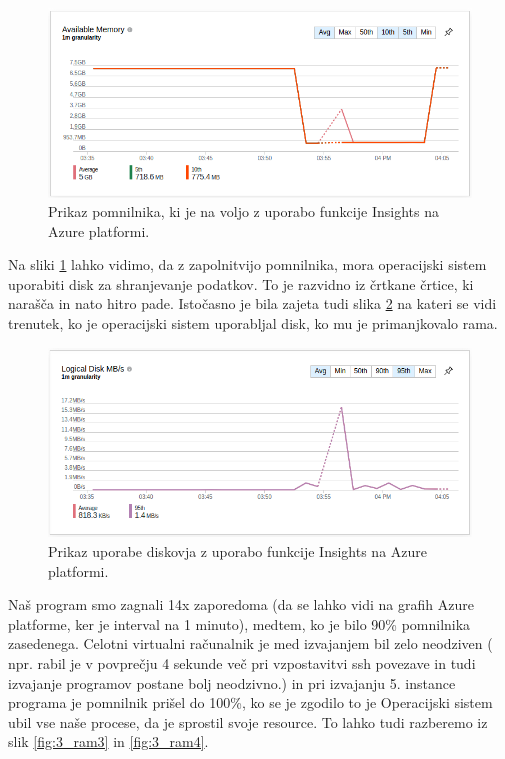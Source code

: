 \begin{figure}[H]
	\centering
	\includegraphics[scale=0.46]{Img/3_ram_obr1.png}
	\caption{Prikaz pomnilnika, ki je na voljo z uporabo funkcije Insights na Azure platformi.}
	\label{fig:3_ram1}
\end{figure}

Na sliki \ref{fig:3_ram1} lahko vidimo, da z zapolnitvijo pomnilnika, mora operacijski sistem uporabiti disk za shranjevanje podatkov. To je razvidno iz črtkane črtice, ki narašča in nato hitro pade. Istočasno je bila zajeta tudi slika \ref{fig:3_ram2} na kateri se vidi trenutek, ko je operacijski sistem uporabljal disk, ko mu je primanjkovalo rama. 

\begin{figure}[H]
	\centering
	\includegraphics[scale=0.46]{Img/3_ram_obr2.png}
	\caption{Prikaz  uporabe diskovja z uporabo funkcije Insights na Azure platformi.}
	\label{fig:3_ram2}
\end{figure}


Naš program smo zagnali 14x zaporedoma (da se lahko vidi na grafih Azure platforme, ker je interval na 1 minuto),
medtem, ko je bilo 90\% pomnilnika zasedenega. Celotni virtualni računalnik je med izvajanjem bil zelo neodziven ( npr.
rabil je v povprečju 4 sekunde več pri vzpostavitvi ssh povezave in tudi izvajanje programov postane bolj neodzivno.) in pri izvajanju 5. instance programa je pomnilnik prišel do 100\%, ko se je zgodilo to je Operacijski sistem ubil vse naše procese, da je sprostil svoje resource. To lahko tudi razberemo iz slik \ref{fig:3_ram3} in \ref{fig:3_ram4}.


